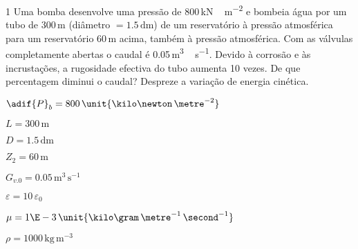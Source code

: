 \documentclass[\mainfilename]{subfiles}
\begin{document}
\begin{questionBox}1{ %
    Uma bomba desenvolve uma pressão de 800\,\unit{\kilo\newton\,\metre^{-2}} e bombeia água por um tubo de 300\,\unit{\metre} (diâmetro \(= 1.5\,\unit{\deci\metre}\)) de um reservatório à pressão atmosférica para um reservatório 60\,\unit{\metre} acima, também à pressão atmosférica. Com as válvulas completamente abertas o caudal é 0.05\,\unit{\metre^3\,\second^{-1}}. Devido à corrosão e às incrustações, a rugosidade efectiva do tubo aumenta 10 vezes. De que percentagem diminui o caudal? Despreze a variação de energia cinética.
} %
    
    \begin{itemize}
        \begin{multicols}{3}
            \item \(\adif{P}_b = 800\,\unit{\kilo\newton\,\metre^{-2}}\)
            \item \(L = 300\,\unit{\metre}\)
            \item \(D = 1.5\,\unit{\deci\metre}\)
            \item \(Z_2 = 60\,\unit{\metre}\)
            \item \(G_{v.0} = 0.05\,\unit{\metre^3\,\second^{-1}}\)
            \item \(\varepsilon=10\,\varepsilon_0\)
            \item \(\mu = 1\E-3\,\unit{\kilo\gram\,\metre^{-1}\,\second^{-1}}\)
            \item \(\rho = 1000\,\unit{\kilo\gram\,\metre^{-3}}\) 
        \end{multicols}
    \end{itemize}


\end{questionBox}
\end{document}
